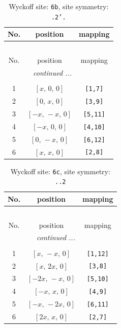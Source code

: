 \documentclass[fleqn,8pt]{jsarticle}
\begin{document}
\begin{longtable}{ccc}
\caption{Wyckoff site: {\tt 6b}, site symmetry: {\tt .2'.}}
 \\
 \hline \hline
No. & position & mapping \\ \hline \endfirsthead

\multicolumn{2}{l}{\tablename\ \thetable{}} \\
 \hline \hline
No. & position & mapping \\ \hline \endhead

 \hline \hline
\multicolumn{2}{r}{\footnotesize\it continued ...} \\ \endfoot

 \hline \hline
\multicolumn{2}{r}{} \\ \endlastfoot

1 & $\left[ x,\, 0,\, 0 \right]$ & {\tt [1,7]} \\ \hline
2 & $\left[ 0,\, x,\, 0 \right]$ & {\tt [3,9]} \\ \hline
3 & $\left[ - x,\, - x,\, 0 \right]$ & {\tt [5,11]} \\ \hline
4 & $\left[ - x,\, 0,\, 0 \right]$ & {\tt [4,10]} \\ \hline
5 & $\left[ 0,\, - x,\, 0 \right]$ & {\tt [6,12]} \\ \hline
6 & $\left[ x,\, x,\, 0 \right]$ & {\tt [2,8]} \\
\end{longtable}
\renewcommand{\arraystretch}{1.2}
\begin{longtable}{ccc}
\caption{Wyckoff site: {\tt 6c}, site symmetry: {\tt ..2}}
 \\
 \hline \hline
No. & position & mapping \\ \hline \endfirsthead

\multicolumn{2}{l}{\tablename\ \thetable{}} \\
 \hline \hline
No. & position & mapping \\ \hline \endhead

 \hline \hline
\multicolumn{2}{r}{\footnotesize\it continued ...} \\ \endfoot

 \hline \hline
\multicolumn{2}{r}{} \\ \endlastfoot

1 & $\left[ x,\, - x,\, 0 \right]$ & {\tt [1,12]} \\ \hline
2 & $\left[ x,\, 2 x,\, 0 \right]$ & {\tt [3,8]} \\ \hline
3 & $\left[ - 2 x,\, - x,\, 0 \right]$ & {\tt [5,10]} \\ \hline
4 & $\left[ - x,\, x,\, 0 \right]$ & {\tt [4,9]} \\ \hline
5 & $\left[ - x,\, - 2 x,\, 0 \right]$ & {\tt [6,11]} \\ \hline
6 & $\left[ 2 x,\, x,\, 0 \right]$ & {\tt [2,7]} \\
\end{longtable}
\end{document}
